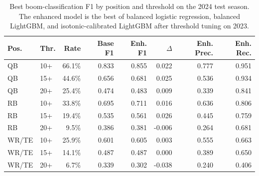 \begin{table}[!htbp]
\caption{Best boom-classification F1 by position and threshold on the 2024 test season. The enhanced model is the best of balanced logistic regression, balanced LightGBM, and isotonic-calibrated LightGBM after threshold tuning on 2023.}
\label{tab:boom}
\centering
\footnotesize
\begin{tabular}{llrrrrrr}
\toprule
Pos. & Thr. & Rate & Base F1 & Enh. F1 & $\Delta$ & Enh. Prec. & Enh. Rec. \\
\midrule
QB & 10+ & 66.1\% & 0.833 & 0.855 & 0.022 & 0.777 & 0.951 \\
QB & 15+ & 44.6\% & 0.656 & 0.681 & 0.025 & 0.536 & 0.934 \\
QB & 20+ & 25.4\% & 0.474 & 0.483 & 0.009 & 0.339 & 0.841 \\
RB & 10+ & 33.8\% & 0.695 & 0.711 & 0.016 & 0.636 & 0.806 \\
RB & 15+ & 19.4\% & 0.535 & 0.561 & 0.026 & 0.445 & 0.759 \\
RB & 20+ & 9.5\% & 0.386 & 0.381 & -0.006 & 0.264 & 0.681 \\
WR/TE & 10+ & 25.9\% & 0.601 & 0.605 & 0.003 & 0.555 & 0.663 \\
WR/TE & 15+ & 14.1\% & 0.487 & 0.487 & 0.000 & 0.389 & 0.650 \\
WR/TE & 20+ & 6.7\% & 0.339 & 0.302 & -0.038 & 0.240 & 0.406 \\
\bottomrule
\end{tabular}
\end{table}
